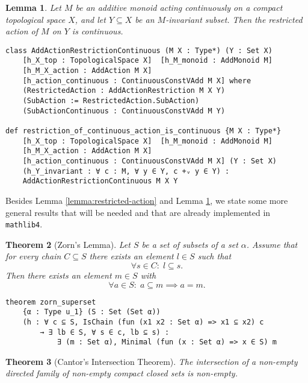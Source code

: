 \documentclass[11pt]{article}
\newtheorem{theorem}{Theorem}[section]
\newtheorem{lemma}[theorem]{Lemma}
\theoremstyle{definition}              %
\theoremstyle{definition}              %
\theoremstyle{definition}              %
\begin{document}
\begin{lemma}\label{lemma:restricted-action-cont}
Let $M$ be an additive monoid acting continuously on a compact topological space $X$, and let $Y \subseteq X$ be an $M$-invariant subset. Then the restricted action of $M$ on $Y$ is continuous.
\end{lemma}

\begin{lstlisting}
class AddActionRestrictionContinuous (M X : Type*) (Y : Set X) 
    [h_X_top : TopologicalSpace X]  [h_M_monoid : AddMonoid M] 
    [h_M_X_action : AddAction M X] 
    [h_action_continuous : ContinuousConstVAdd M X] where
    (RestrictedAction : AddActionRestriction M X Y)
    (SubAction := RestrictedAction.SubAction)
    (SubActionContinuous : ContinuousConstVAdd M Y)

def restriction_of_continuous_action_is_continuous {M X : Type*} 
    [h_X_top : TopologicalSpace X]  [h_M_monoid : AddMonoid M] 
    [h_M_X_action : AddAction M X] 
    [h_action_continuous : ContinuousConstVAdd M X] (Y : Set X) 
    (h_Y_invariant : ∀ c : M, ∀ y ∈ Y, c +ᵥ y ∈ Y) : 
    AddActionRestrictionContinuous M X Y 
\end{lstlisting}

Besides Lemma \ref{lemma:restricted-action} and Lemma \ref{lemma:restricted-action-cont}, we state some more general results that will be needed and that are already implemented in \texttt{mathlib4}.

\begin{theorem}[Zorn's Lemma]\label{thm:zorn-lemma}
Let $S$ be a set of subsets of a set $\alpha$. Assume that for every chain $C \subseteq S$ there exists an element $l \in S$ such that 
\[\forall s \in C: \; l \subseteq s.\]
Then there exists an element $m \in S$ with 
\[\forall a \in S: \; a \subseteq m \implies a = m.\]
\end{theorem}

\begin{lstlisting}
theorem zorn_superset 
    {α : Type u_1} (S : Set (Set α))
    (h : ∀ c ⊆ S, IsChain (fun (x1 x2 : Set α) => x1 ⊆ x2) c
        → ∃ lb ∈ S, ∀ s ∈ c, lb ⊆ s) :
            ∃ (m : Set α), Minimal (fun (x : Set α) => x ∈ S) m
\end{lstlisting}

\begin{theorem}[Cantor's Intersection Theorem]\label{thm:cantor-intersection}
The intersection of a non-empty directed family of non-empty compact closed sets is non-empty.
\end{theorem}
\end{document}
